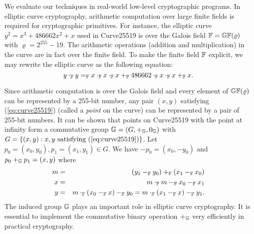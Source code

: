 
We evaluate our techniques in real-world low-level cryptographic
programs. In elliptic curve cryptography, arithmetic computation over
large finite fields is required for cryptographic primitives. For
instance, the elliptic curve $y^2 = x^3 + 486662 x^2 + x$ used in 
Curve25519 is over the Galois field $\mathbb{F} = \mathbb{GF}(\varrho)$ with
$\varrho = 2^{255} - 19$. The arithmetic operations (addition and
multiplication) in the curve are in fact over the finite field. To
make the finite field $\mathbb{F}$ explicit, we may rewrite the elliptic
curve as the following equation: 
\begin{equation}
  \label{eq:curve25519}
  y \cdot_{\mathbb{F}} y =_{\mathbb{F}} x \cdot_{\mathbb{F}} x \cdot_{\mathbb{F}} x +_{\mathbb{F}}
  486662 \cdot_{\mathbb{F}} x \cdot_{\mathbb{F}} x +_{\mathbb{F}} x.
\end{equation}

Since arithmetic computation is over the Galois field and every
element of $\mathbb{GF}(\varrho)$ can be represented by a 255-bit number,
any pair $(x, y)$ satisfying (\ref{eq:curve25519}) (called a
\emph{point} on the curve) can be represented by a pair of 255-bit
numbers. It can be shown that points on Curve25519 with the point at
infinity form a commutative group $\mathbb{G} = (G, +_{\mathbb{G}}, 0_{\mathbb{G}})$
with $G = \{ (x, y) : x, y \textmd{ satisfying } (\ref{eq:curve25519})
\}$. Let $p_0 = (x_0, y_0), p_1 = (x_1, y_1) \in G$. We have $-p_0 =
(x_0, -y_0)$ and $p_0 +_{\mathbb{G}} p_1 = (x, y)$ where
\begin{eqnarray}
  m & = & (y_1 -_{\mathbb{F}} y_0) \div_{\mathbb{F}} (x_1 -_{\mathbb{F}} x_0)\\
  x & = & m \cdot_{\mathbb{F}} m -_{\mathbb{F}} x_0 -_{\mathbb{F}} x_1\\
  y & = & m \cdot_{\mathbb{F}} (x_0 -_{\mathbb{F}} x) -_{\mathbb{F}} y_0
     = m \cdot_{\mathbb{F}} (x_1 -_{\mathbb{F}} x) -_{\mathbb{F}} y_1.
  \label{eq:curve25519-group}
\end{eqnarray}
The induced group $\mathbb{G}$ plays an important role in elliptic
curve cryptography. It is essential to implement the commutative binary
operation $+_{\mathbb{G}}$ very efficiently in practical cryptography. 